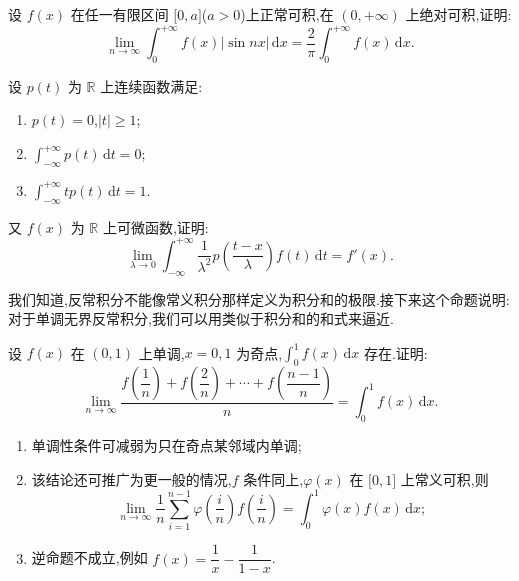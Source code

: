 \documentclass[../../数学分析培优讲义.tex]{subfiles}
\begin{document}
\begin{example}
设 $f(x)$ 在任一有限区间 $\lbrack 0,a\rbrack$($a>0$)上正常可积,在 $(0,+\infty)$ 上绝对可积,证明:
\[
    \lim\limits_{n\to\infty}\int_0^{+\infty}f(x)|\sin nx|\,\mathrm{d}x
    =\dfrac{2}{\pi}\int_0^{+\infty}f(x)\,\mathrm{d}x.
\]
\end{example}
\exampleblank

\begin{example}
设 $p(t)$ 为 $\mathbb{R}$ 上连续函数满足:
\begin{enumerate}[label=(\arabic*)]
    \item $p(t)=0$,$|t|\geq1$;
    \item $\displaystyle\int_{-\infty}^{+\infty}p(t)\,\mathrm{d}t=0$;
    \item $\displaystyle\int_{-\infty}^{+\infty}tp(t)\,\mathrm{d}t=1$.
\end{enumerate}
又 $f(x)$ 为 $\mathbb{R}$ 上可微函数,证明:
\[
    \lim\limits_{\lambda\to0}\int_{-\infty}^{+\infty}
    \dfrac{1}{\lambda^2}p\left(\dfrac{t-x}{\lambda}\right)f(t)\,\mathrm{d}t
    =f'(x).
\]
\end{example}
\exampleblank

我们知道,反常积分不能像常义积分那样定义为积分和的极限.接下来这个命题说明:对于单调无界反常积分,我们可以用类似于积分和的和式来逼近.

\begin{proposition}[\markstar]
设 $f(x)$ 在 $(0,1)$ 上单调,$x=0,1$ 为奇点,$\displaystyle\int_0^1f(x)\,\mathrm{d}x$ 存在.证明:
\[
    \lim\limits_{n\to\infty}
    \dfrac{f\left(\dfrac{1}{n}\right)+f\left(\dfrac{2}{n}\right)+\cdots+f\left(\dfrac{n-1}{n}\right)}{n}
    =\int_0^1f(x)\,\mathrm{d}x.
\]
\end{proposition}

\begin{remark}
\begin{enumerate}[label=\textcircled{\arabic*}]
    \item 单调性条件可减弱为只在奇点某邻域内单调;
    \item 该结论还可推广为更一般的情况,$f$ 条件同上,$\varphi(x)$ 在 $\lbrack 0,1\rbrack$ 上常义可积,则
    \[
        \lim\limits_{n\to\infty}\dfrac{1}{n}\sum\limits_{i=1}^{n-1}
        \varphi\left(\dfrac{i}{n}\right)f\left(\dfrac{i}{n}\right)
        =\int_0^1\varphi(x)f(x)\,\mathrm{d}x;
    \]
    \item 逆命题不成立,例如 $f(x)=\dfrac{1}{x}-\dfrac{1}{1-x}$.
\end{enumerate}
\end{remark}
\end{document}
